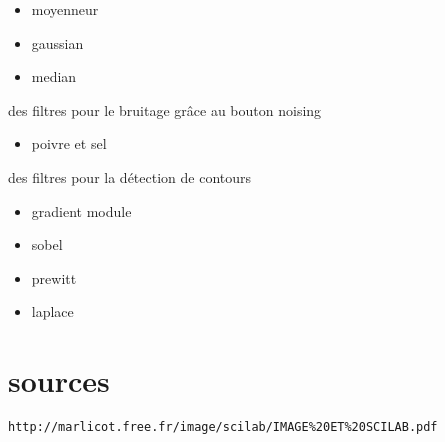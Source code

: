 \documentclass[a4paper , 10pt]{article}
\begin{document}
\begin{itemize}
\item moyenneur
\item gaussian
\item median
\end{itemize}
des filtres pour le bruitage grâce au bouton noising
\begin{itemize}
\item poivre et sel
\end{itemize}
des filtres pour la détection de contours 
\begin{itemize}
\item gradient module
\item sobel
\item prewitt
\item laplace
\end{itemize}

\section{sources}
\begin{verbatim}
http://marlicot.free.fr/image/scilab/IMAGE%20ET%20SCILAB.pdf
\end{verbatim}
\end{document}
